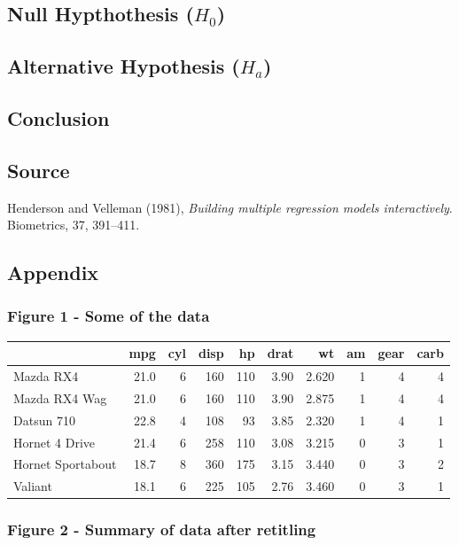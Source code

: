 \documentclass[]{article}
\begin{document}
\subsection{Null Hypthothesis
(\(H_{0}\))}\label{null-hypthothesis-hux5f0}

\subsection{Alternative Hypothesis
(\(H_{a}\))}\label{alternative-hypothesis-hux5fa}

\subsection{Conclusion}\label{conclusion}

\subsection{Source}\label{source}

Henderson and Velleman (1981), \emph{Building multiple regression models
interactively}. Biometrics, 37, 391--411.

\subsection{Appendix}\label{appendix}

\subsubsection{Figure 1 - Some of the
data}\label{figure-1---some-of-the-data}

\begin{longtable}[c]{@{}lrrrrrrrrr@{}}
\toprule
& mpg & cyl & disp & hp & drat & wt & am & gear & carb\tabularnewline
\midrule
\endhead
Mazda RX4 & 21.0 & 6 & 160 & 110 & 3.90 & 2.620 & 1 & 4 &
4\tabularnewline
Mazda RX4 Wag & 21.0 & 6 & 160 & 110 & 3.90 & 2.875 & 1 & 4 &
4\tabularnewline
Datsun 710 & 22.8 & 4 & 108 & 93 & 3.85 & 2.320 & 1 & 4 &
1\tabularnewline
Hornet 4 Drive & 21.4 & 6 & 258 & 110 & 3.08 & 3.215 & 0 & 3 &
1\tabularnewline
Hornet Sportabout & 18.7 & 8 & 360 & 175 & 3.15 & 3.440 & 0 & 3 &
2\tabularnewline
Valiant & 18.1 & 6 & 225 & 105 & 2.76 & 3.460 & 0 & 3 & 1\tabularnewline
\bottomrule
\end{longtable}

\subsubsection{Figure 2 - Summary of data after
retitling}\label{figure-2---summary-of-data-after-retitling}
\end{document}
